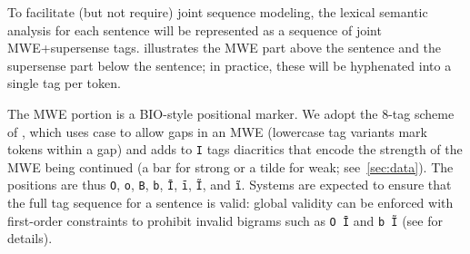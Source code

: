 \documentclass[11pt]{article}
\begin{document}




To facilitate (but not require) joint sequence modeling, 
the lexical semantic analysis for each sentence will be represented as 
a sequence of joint MWE+supersense tags.  illustrates 
the MWE part above the sentence and the supersense part below the sentence; 
in practice, these will be hyphenated into a single tag per token.

The MWE portion is a BIO-style \citep{ramshaw-95} 
positional marker. We adopt the 8-tag scheme of \citet{schneider-14}, 
which uses case to allow gaps in an MWE (lowercase tag variants mark 
tokens within a gap) and adds to \texttt{I} tags 
diacritics that encode the strength of the MWE being continued (a bar for strong or a tilde for weak; see~\cref{sec:data}).
The positions are thus \texttt{O}, \texttt{o}, \texttt{B}, \texttt{b},
\texttt{Ī}, \texttt{ī}, \texttt{Ĩ}, and \texttt{ĩ}.
Systems are expected to ensure that the full tag sequence for a sentence is valid: 
global validity can be enforced with first-order constraints 
to prohibit invalid bigrams such as \texttt{O~Ī} and \texttt{b~Ĩ} (see \citealp{schneider-14} for details).
\end{document}
